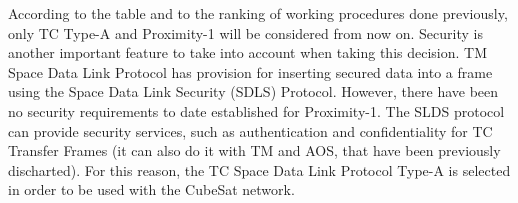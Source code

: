 \documentclass[12pt,a4paper]{report}
\begin{document}
According to the table and to the ranking of working procedures done previously, only TC Type-A and Proximity-1 will be considered from now on. Security is another important feature to take into account when taking this decision. TM Space Data Link Protocol has provision for inserting secured data into a frame using the Space Data Link Security (SDLS) Protocol. However, there have been no security requirements to date established for Proximity-1. The SLDS protocol can provide security services, such as authentication and confidentiality for TC Transfer Frames (it can also do it with TM and AOS, that have been previously discharted). For this reason, the TC Space Data Link Protocol Type-A is selected in order to be used with the CubeSat network. 

 
\end{document}
